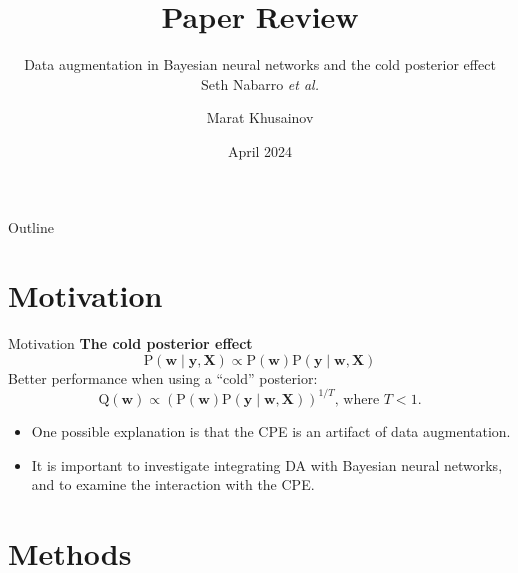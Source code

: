 \documentclass[10pt, handout, envcountsect]{beamer} %
\title[Paper Review]{Paper Review}
\subtitle{
\large{Data augmentation in Bayesian neural networks and the cold posterior effect}
\\
\vspace{3pt}
\normalsize{Seth Nabarro \textit{et al.}}
}
\author{Marat Khusainov}
\date{April 2024}
\begin{document}
\maketitle


\begin{frame}{Outline}

\tableofcontents

\end{frame}

\section{Motivation}


\begin{frame}{Motivation}
\textbf{The cold posterior effect}
\begin{equation}
\mathrm{P}(\mathbf{w} \mid \mathbf{y}, \mathbf{X}) \propto \mathrm{P}(\mathbf{w}) \mathrm{P}(\mathbf{y} \mid \mathbf{w}, \mathbf{X}) \tag{1}
\end{equation}
Better performance when using a “cold” posterior:
\begin{equation*}
\mathrm{Q}(\mathbf{w}) \propto(\mathrm{P}(\mathbf{w}) \mathrm{P}(\mathbf{y} \mid \mathbf{w}, \mathbf{X}))^{1 / T} \tag{2} \text{, where $T<1$.}
\end{equation*}

\begin{itemize}
    \vspace{7pt}
    \item One possible explanation is that the CPE is an artifact of data augmentation.
    \vspace{3pt}
    \item It is important to investigate integrating DA with Bayesian neural networks, and to examine the interaction with the CPE.


\end{itemize}
\end{frame}




\section{Methods}
\end{document}
